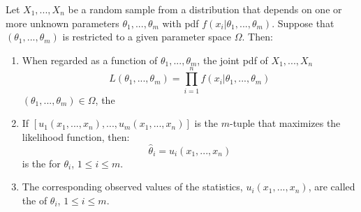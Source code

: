 \documentclass[12pt, a4paper, twoside, openright, titlepage]{book}
\begin{document}
\begin{defn}{}{}
    Let $X_1,...,X_n$ be a random sample from a distribution that depends on one or more unknown parameters $\theta_1,...,\theta_m$ with pdf $f(x_i\vert\theta_1,...,\theta_m)$. Suppose that $(\theta_1,...,\theta_m)$ is restricted to a given parameter space $\Omega$. Then: \begin{enumerate}
        \item When regarded as a function of $\theta_1,...,\theta_m$, the joint pdf of $X_1,...,X_n$ \begin{equation*}
                L(\theta_1,...,\theta_m) = \prod_{i=1}^nf(x_i\vert\theta_1,...,\theta_m)
        \end{equation*}
            $(\theta_1,...,\theta_m) \in \Omega$, the 
        \item If $[u_1(x_1,...,x_n),...,u_m(x_1,...,x_n)]$ is the $m$-tuple that maximizes the likelihood function, then: \begin{equation*}
                \hat{\theta}_i = u_i(x_1,...,x_n)
        \end{equation*}
            is the  for $\theta_i$, $1 \leq i \leq m$.
        \item The corresponding observed values of the statistics, $u_i(x_1,...,x_n)$, are called the  of $\theta_i$, $1 \leq i \leq m$.
    \end{enumerate}
\end{defn}
\end{document}
